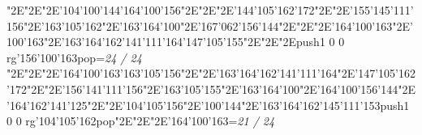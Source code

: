 \null\vfill\enskip\enskip\enskip\ipa\char"2E\enskip\enskip\enskip\ipa\char"2E\enskip\ipa\char"2E\ipa\char'104\ipa\char'100\ipa\char'144\bigskip\ipa\char'164\ipa\char'100\ipa\char'156\ipa\char"2E\enskip\enskip\enskip\ipa\char"2E\enskip\enskip\enskip\enskip\enskip\enskip\bigskip\enskip\enskip\ipa\char"2E\ipa\char'144\ipa\char'105\ipa\char'162\ipa\char'172\ipa\char"2E\enskip\ipa\char"2E\ipa\char'155\ipa\char'145\ipa\char'111\ipa\char'156\ipa\char"2E\ipa\char'163\ipa\char'105\ipa\char'162\ipa\char"2E\ipa\char'163\ipa\char'164\ipa\char'100\ipa\char"2E\ipa\char'167\ipa\char'062\ipa\char'156\ipa\char'144\bigskip\enskip\ipa\char"2E\enskip\enskip\enskip\enskip\ipa\char"2E\enskip\enskip\ipa\char"2E\ipa\char'164\ipa\char'100\ipa\char'163\ipa\char"2E\ipa\char'100\ipa\char'163\ipa\char"2E\ipa\char'163\ipa\char'164\ipa\char'162\ipa\char'141\ipa\char'111\ipa\char'164\bigskip\ipa\char'147\ipa\char'105\ipa\char'155\ipa\char"2E\enskip\enskip\ipa\char"2E\enskip\enskip\enskip\ipa\char"2E\pdfcolorstack\match push{1 0 0 rg}\ipa\char'156\ipa\char'100\ipa\char'163\pdfcolorstack\match pop{}\bigskip\vfill\footline={\hfill\tenrm\it 24 / 24}\eject
\null\vfill\enskip\enskip\enskip\ipa\char"2E\enskip\enskip\enskip\ipa\char"2E\enskip\ipa\char"2E\ipa\char'164\ipa\char'100\ipa\char'163\bigskip\ipa\char'163\ipa\char'105\ipa\char'156\ipa\char"2E\enskip\enskip\enskip\ipa\char"2E\ipa\char'163\ipa\char'164\ipa\char'162\ipa\char'141\ipa\char'111\ipa\char'164\bigskip\enskip\enskip\ipa\char"2E\ipa\char'147\ipa\char'105\ipa\char'162\ipa\char'172\ipa\char"2E\enskip\ipa\char"2E\ipa\char'156\ipa\char'141\ipa\char'111\ipa\char'156\ipa\char"2E\ipa\char'163\ipa\char'105\ipa\char'155\ipa\char"2E\ipa\char'163\ipa\char'164\ipa\char'100\ipa\char"2E\ipa\char'164\ipa\char'100\ipa\char'156\ipa\char'144\bigskip\enskip\ipa\char"2E\ipa\char'164\ipa\char'162\ipa\char'141\ipa\char'125\ipa\char"2E\enskip\enskip\ipa\char"2E\ipa\char'104\ipa\char'105\ipa\char'156\ipa\char"2E\ipa\char'100\ipa\char'144\ipa\char"2E\ipa\char'163\ipa\char'164\ipa\char'162\ipa\char'145\ipa\char'111\ipa\char'153\bigskip\pdfcolorstack\match push{1 0 0 rg}\ipa\char'104\ipa\char'105\ipa\char'162\pdfcolorstack\match pop{}\ipa\char"2E\enskip\enskip\ipa\char"2E\enskip\enskip\enskip\ipa\char"2E\ipa\char'164\ipa\char'100\ipa\char'163\bigskip\vfill\footline={\hfill\tenrm\it 21 / 24}\eject
